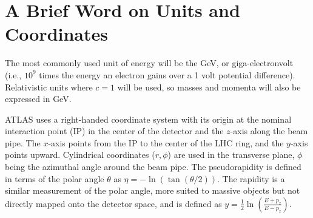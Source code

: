 \section{A Brief Word on Units and Coordinates}

The most commonly used unit of energy will be the GeV, or giga-electronvolt (i.e., $10^9$ times the energy an electron gains over a 1 volt potential difference). Relativistic units where $c=1$ will be used, so masses and momenta will also be expressed in GeV.

ATLAS uses a right-handed coordinate system with its origin at the nominal interaction point (IP) in the center of the detector and the $z$-axis along the beam pipe. The $x$-axis points from the IP to the center of the LHC ring, and the $y$-axis points upward. Cylindrical coordinates ($r, \phi$) are used in the transverse plane, $\phi$ being the azimuthal angle around the beam pipe. The pseudorapidity is defined in terms of the polar angle $\theta$ as $\eta = −\ln(\tan(\theta/2))$. The rapidity is a similar measurement of the polar angle, more suited to massive objects but not directly mapped onto the detector space, and is defined as $y = \frac{1}{2} \ln\left(\frac{E+p_z}{E-p_z} \right)$.